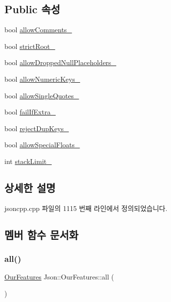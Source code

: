 \subsection*{Public 속성}
\begin{DoxyCompactItemize}
\item 
bool \hyperlink{class_json_1_1_our_features_ac71bb7ba7363d3b05ed76602b036ce33}{allow\+Comments\+\_\+}
\item 
bool \hyperlink{class_json_1_1_our_features_a2095f66a776c0a4ae6cc931a0c94242e}{strict\+Root\+\_\+}
\item 
bool \hyperlink{class_json_1_1_our_features_a13963bc44bf948eec1968f7ff8e8f5f1}{allow\+Dropped\+Null\+Placeholders\+\_\+}
\item 
bool \hyperlink{class_json_1_1_our_features_af6973fc7e774ce2d634ba99442aeb91a}{allow\+Numeric\+Keys\+\_\+}
\item 
bool \hyperlink{class_json_1_1_our_features_abbd6c196d7a22e2a360a59887eda4610}{allow\+Single\+Quotes\+\_\+}
\item 
bool \hyperlink{class_json_1_1_our_features_ae8ad25b90706c78f1a8fe929191ac61b}{fail\+If\+Extra\+\_\+}
\item 
bool \hyperlink{class_json_1_1_our_features_a39b8e0b86b1c24a45e800c023bb715aa}{reject\+Dup\+Keys\+\_\+}
\item 
bool \hyperlink{class_json_1_1_our_features_af760f91cc2a7af37e44f78fb466061bb}{allow\+Special\+Floats\+\_\+}
\item 
int \hyperlink{class_json_1_1_our_features_a9a786713902d14be6d57a08cc03ccfff}{stack\+Limit\+\_\+}
\end{DoxyCompactItemize}


\subsection{상세한 설명}


jsoncpp.\+cpp 파일의 1115 번째 라인에서 정의되었습니다.



\subsection{멤버 함수 문서화}
\mbox{\label{class_json_1_1_our_features_a0686e1406b6677f496529f9f3fe98d1e}} 
\subsubsection{\texorpdfstring{all()}{all()}}
{\footnotesize\ttfamily \hyperlink{class_json_1_1_our_features}{Our\+Features} Json\+::\+Our\+Features\+::all (\begin{DoxyParamCaption}{ }\end{DoxyParamCaption})\hspace{0.3cm}{\ttfamily [static]}}



